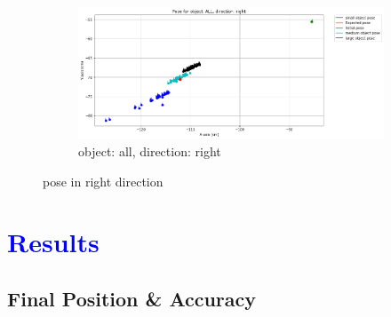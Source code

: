 \documentclass[10pt,a4paper]{article}
\begin{document}
								\begin{figure}[H]
%									
									\begin{subfigure}{\textwidth}
										\centering
										\includegraphics[width=0.8\linewidth]{img/pose_all_right.png}
										\caption{object: all, direction: right}
										\label{fig:object: all, direction: right}
									\end{subfigure}
									
									\caption{pose in right direction}
									\label{fig:pose in right direction}
								\end{figure}

					
				\section{\textcolor{blue}{Results}}
					\subsection{Final Position \& Accuracy }
\end{document}

